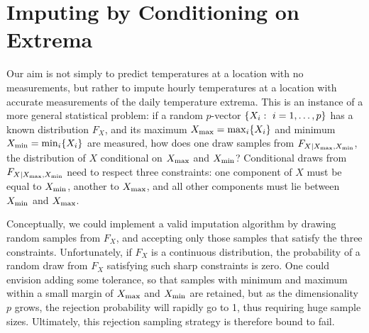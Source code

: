 \documentclass[12pt]{article}
\begin{document}
\section{Imputing by Conditioning on Extrema}
\label{imputations}
    
Our aim is not simply to predict temperatures at a location with no measurements, but rather to impute hourly temperatures at a location with accurate measurements of the daily temperature extrema.
This is an instance of a more general statistical problem: if a random \(p\)-vector \(\left\lbrace X_i:~i=1,\dotsc,p\right\rbrace\) has a known distribution \(F_X\), and its maximum \(\Xmax = \max_i\cbr{X_i}\) and minimum \(\Xmin = \min_i\cbr{X_i}\) are measured, how does one draw samples from \(F_{X \mid X_{\max},X_{\min}}\), the distribution of \(X\) conditional on \(X_{\max}\) and \(X_{\min}\)?
Conditional draws from \(F_{X \mid X_{\max},X_{\min}}\) need to respect three constraints: one component of \(X\) must be equal to \(X_{\min}\), another to \(X_{\max}\), and all other components must lie between \(X_{\min}\) and \(X_{\max}\).

Conceptually, we could implement a valid imputation algorithm by drawing random samples from \(F_X\),
and accepting only those samples that satisfy the three constraints.
Unfortunately, if \(F_X\) is a continuous distribution, the probability of a random draw from \(F_X\) satisfying such sharp constraints is zero.
One could envision adding some tolerance, so that samples with minimum and maximum within a small margin of \(X_{\max}\) and \(X_{\min}\) are retained, but as the dimensionality \(p\) grows, the rejection probability will rapidly go to 1, thus requiring huge sample sizes.
Ultimately, this rejection sampling strategy is therefore bound to fail.
\end{document}
